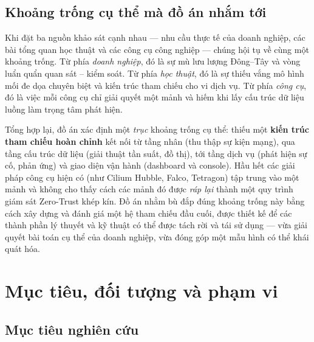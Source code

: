 \subsection{Khoảng trống cụ thể mà đồ án nhắm tới}

Khi đặt ba nguồn khảo sát cạnh nhau --- nhu cầu thực tế của doanh nghiệp, các bài tổng
quan học thuật và các công cụ công nghiệp --- chúng hội tụ về cùng một khoảng trống. Từ
phía \emph{doanh nghiệp}, đó là sự mù lưu lượng Đông--Tây và vòng luẩn quẩn quan
sát -- kiểm soát. Từ phía \emph{học thuật}, đó là sự thiếu vắng mô hình mối đe dọa chuyên
biệt và kiến trúc tham chiếu cho vi dịch vụ. Từ phía \emph{công cụ}, đó là việc mỗi công cụ
chỉ giải quyết một mảnh và hiếm khi lấy cấu trúc dữ liệu luồng làm trọng tâm phát hiện.

Tổng hợp lại, đồ án xác định một \textit{trục} khoảng trống cụ thể: thiếu một \textbf{kiến
trúc tham chiếu hoàn chỉnh} kết nối từ tầng nhân (thu thập sự kiện mạng), qua tầng cấu trúc
dữ liệu (giải thuật tần suất, đồ thị), tới tầng dịch vụ (phát hiện sự cố, phản ứng) và giao
diện vận hành (dashboard và console). Hầu hết các giải pháp công cụ hiện có (như Cilium
Hubble, Falco, Tetragon) tập trung vào một mảnh và không cho thấy cách các mảnh đó được
\textit{ráp lại} thành một quy trình giám sát Zero-Trust khép kín. Đồ án nhằm bù đắp đúng
khoảng trống này bằng cách xây dựng và đánh giá một hệ tham chiếu đầu cuối, được thiết kế
để các thành phần lý thuyết và kỹ thuật có thể được tách rời và tái sử dụng --- vừa giải
quyết bài toán cụ thể của doanh nghiệp, vừa đóng góp một mẫu hình có thể khái quát hóa.

\section{Mục tiêu, đối tượng và phạm vi}

\subsection{Mục tiêu nghiên cứu}

